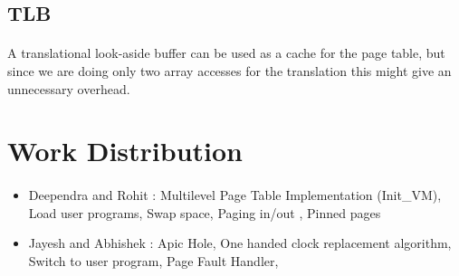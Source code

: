 \documentclass[11pt]{article}
\begin{document}
\subsection{TLB}
\paragraph{}
A translational look-aside buffer can be used as a cache for the page table, but since we are doing only two array accesses for the translation this might give an unnecessary overhead.

\section{Work Distribution}
\paragraph{}
\begin{itemize}
\item Deependra and Rohit : Multilevel Page Table Implementation (Init\_VM), Load user programs, Swap space, Paging in/out , Pinned pages
\item Jayesh and Abhishek : Apic Hole, One handed clock replacement algorithm,  Switch to user program, Page Fault Handler, 
\end{itemize}
\end{document}
